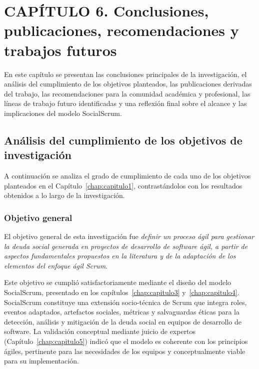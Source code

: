 \chapter*{CAPÍTULO 6. Conclusiones, publicaciones, recomendaciones y trabajos futuros}
\setcounter{chapter}{6}
\setcounter{section}{0}
\setcounter{subsection}{0}
\setcounter{subsubsection}{0}
\setcounter{figure}{0}
\setcounter{table}{0}
\renewcommand{\thesection}{\thechapter.\arabic{section}}
\renewcommand{\thesubsection}{\thesection.\arabic{subsection}}
\renewcommand{\thesubsubsection}{\thesubsection.\arabic{subsubsection}}
\makeatletter
\protected@edef\@currentlabel{\thechapter}%
\makeatother
\label{chap:capitulo6}

\setlength{\parindent}{0pt}

En este capítulo se presentan las conclusiones principales de la investigación, el análisis del cumplimiento de los objetivos planteados, las publicaciones derivadas del trabajo, las recomendaciones para la comunidad académica y profesional, las líneas de trabajo futuro identificadas y una reflexión final sobre el alcance y las implicaciones del modelo SocialScrum.

\section{Análisis del cumplimiento de los objetivos de investigación}
\label{sec:analisis-objetivos-investigacion}

A continuación se analiza el grado de cumplimiento de cada uno de los objetivos planteados en el Capítulo~\ref{chap:capitulo1}, contrastándolos con los resultados obtenidos a lo largo de la investigación.

\subsection{Objetivo general}

El objetivo general de esta investigación fue \textit{definir un proceso ágil para gestionar la deuda social generada en proyectos de desarrollo de software ágil, a partir de aspectos fundamentales propuestos en la literatura y de la adaptación de los elementos del enfoque ágil Scrum}.

Este objetivo se cumplió satisfactoriamente mediante el diseño del modelo SocialScrum, presentado en los capítulos~\ref{chap:capitulo3} y~\ref{chap:capitulo4}. SocialScrum constituye una extensión socio-técnica de Scrum que integra roles, eventos adaptados, artefactos sociales, métricas y salvaguardas éticas para la detección, análisis y mitigación de la deuda social en equipos de desarrollo de software. La validación conceptual mediante juicio de expertos (Capítulo~\ref{chap:capitulo5}) indicó que el modelo es coherente con los principios ágiles, pertinente para las necesidades de los equipos y conceptualmente viable para su implementación.

